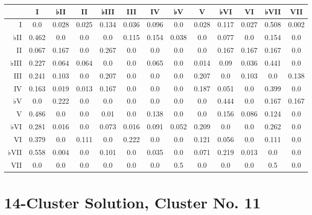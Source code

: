 \begin{table}[htbp]
\begin{minipage}{\linewidth}
\setlength{\tymax}{0.5\linewidth}
\centering
\small
\begin{tabulary}{\textwidth}{@{}RCCCCCCCCCCCC@{}} \toprule
&I&♭II&II&♭III&III&IV&♭V&V&♭VI&VI&♭VII&VII\\
\midrule
I&0.0&0.028&0.025&0.134&0.036&0.096&0.0&0.028&0.117&0.027&0.508&0.002\\
♭II&0.462&0.0&0.0&0.0&0.115&0.154&0.038&0.0&0.077&0.0&0.154&0.0\\
II&0.067&0.167&0.0&0.267&0.0&0.0&0.0&0.0&0.167&0.167&0.167&0.0\\
♭III&0.227&0.064&0.064&0.0&0.0&0.065&0.0&0.014&0.09&0.036&0.441&0.0\\
III&0.241&0.103&0.0&0.207&0.0&0.0&0.0&0.207&0.0&0.103&0.0&0.138\\
IV&0.163&0.019&0.013&0.167&0.0&0.0&0.0&0.187&0.051&0.0&0.399&0.0\\
♭V&0.0&0.222&0.0&0.0&0.0&0.0&0.0&0.0&0.444&0.0&0.167&0.167\\
V&0.486&0.0&0.0&0.01&0.0&0.138&0.0&0.0&0.156&0.086&0.124&0.0\\
♭VI&0.281&0.016&0.0&0.073&0.016&0.091&0.052&0.209&0.0&0.0&0.262&0.0\\
VI&0.379&0.0&0.111&0.0&0.222&0.0&0.0&0.121&0.056&0.0&0.111&0.0\\
♭VII&0.558&0.004&0.0&0.101&0.0&0.035&0.0&0.071&0.219&0.013&0.0&0.0\\
VII&0.0&0.0&0.0&0.0&0.0&0.0&0.5&0.0&0.0&0.0&0.5&0.0\\

\bottomrule

\end{tabulary}
\end{minipage}
\end{table}

\section{14-Cluster Solution, Cluster No. 11}
\label{14-clustersolutionclusterno.11}

